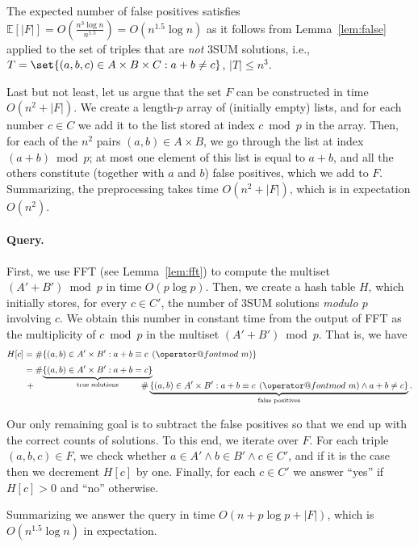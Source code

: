 \documentclass{theoretics}
\makeatletter
\newcommand{\E}{\mathbb{E}}
\newcommand{\tpmod}[1]{\mkern 8mu({\operator@font mod}\mkern 6mu#1)}
\makeatother
\begin{document}
The expected number of false positives satisfies $\E[|F|] = O(\frac{n^3 \log n}{n^{1.5}}) = O(n^{1.5} \log n)$ as it follows from Lemma~\ref{lem:false} applied to the set of triples that are \emph{not} 3SUM solutions, i.e., $T=\set{(a,b,c) \in A \times B \times C : a + b \neq c}$, $|T| \leqslant n^3$.

Last but not least, let us argue that the set $F$ can be constructed in time $O(n^2+|F|)$. We create a length-$p$ array of (initially empty) lists, and for each number $c \in C$ we add it to the list stored at index $c \bmod p$ in the array. Then, for each of the $n^2$ pairs $(a,b) \in A \times B$, we go through the list at index $(a + b) \bmod p$; at most one element of this list is equal to $a+b$, and all the others constitute (together with $a$ and $b$) false positives, which we add to $F$.
Summarizing, the preprocessing takes time ${O}(n^2 + |F|)$, which is in expectation $O(n^2)$.

\paragraph{Query.}
First, we use FFT (see Lemma~\ref{lem:fft}) to compute the multiset $(A'+B') \bmod p$ in time $O(p \log p)$.
Then, we create a hash table $H$, which initially stores, for every $c \in C'$, the number of 3SUM solutions \emph{modulo $p$} involving $c$. We obtain this number in constant time from the output of FFT as the multiplicity of $c \bmod p$ in the multiset $(A'+B') \bmod p$. That is, we have
\begin{align*}
H[c] &= \#\{(a,b) \in A' \times B' : a + b \equiv c \tpmod{m}\} \\[.3em]
& = \#\smash{\underbrace{\{(a,b) \in A' \times B' : a+b=c\}}_{\text{true solutions}}} \\[.3em]
& \, + \hspace{12em}  \#\underbrace{\{(a,b) \in A' \times B' : a + b \equiv c \tpmod{m} \land a + b \neq c\}}_{\text{false positives}}.
\end{align*}

Our only remaining goal is to subtract the false positives so that we end up with the correct counts of solutions. To this end, we iterate over $F$. For each triple $(a,b,c) \in F$, we check whether $a \in A' \land b \in B' \land c \in C'$, and if it is the case then we decrement $H[c]$ by one.
Finally, for each $c \in C'$ we answer ``yes'' if $H[c] > 0$ and ``no'' otherwise.

Summarizing we answer the query in time $O(n + p \log p + |F|)$, which is $O(n^{1.5} \log n)$ in expectation.
\end{document}

